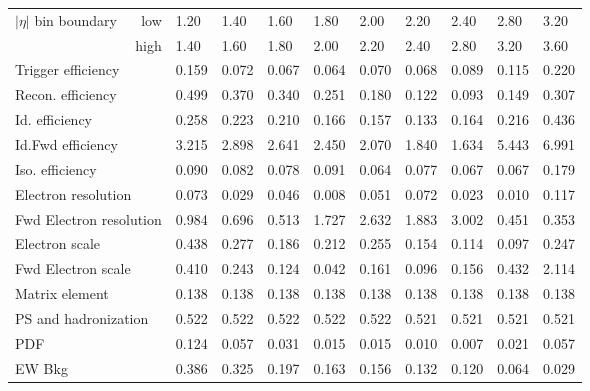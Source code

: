\begin{table}
\centering
\begin{tabular}{l r p{0.7cm}p{0.7cm}p{0.7cm}p{0.7cm}p{0.7cm}p{0.7cm}p{0.7cm}p{0.7cm}l}
\hline \hline
\multirow{2}{*}{$|\eta|$ bin boundary} & low  & 1.20 & 1.40 & 1.60 & 1.80 & 2.00 & 2.20 & 2.40 & 2.80 & 3.20 \\
                                       & high & 1.40 & 1.60 & 1.80 & 2.00 & 2.20 & 2.40 & 2.80 & 3.20 & 3.60  \\
\hline
\multicolumn{2}{l}{Trigger efficiency}            & 0.159 & 0.072 & 0.067 & 0.064 & 0.070 & 0.068 & 0.089 & 0.115 & 0.220 \\
\multicolumn{2}{l}{Recon. efficiency}             & 0.499 & 0.370 & 0.340 & 0.251 & 0.180 & 0.122 & 0.093 & 0.149 & 0.307 \\
\multicolumn{2}{l}{Id. efficiency}                & 0.258 & 0.223 & 0.210 & 0.166 & 0.157 & 0.133 & 0.164 & 0.216 & 0.436 \\
\multicolumn{2}{l}{Id.Fwd efficiency}             & 3.215 & 2.898 & 2.641 & 2.450 & 2.070 & 1.840 & 1.634 & 5.443 & 6.991 \\
\multicolumn{2}{l}{Iso. efficiency}               & 0.090 & 0.082 & 0.078 & 0.091 & 0.064 & 0.077 & 0.067 & 0.067 & 0.179 \\
\multicolumn{2}{l}{Electron resolution}           & 0.073 & 0.029 & 0.046 & 0.008 & 0.051 & 0.072 & 0.023 & 0.010 & 0.117 \\
\multicolumn{2}{l}{Fwd Electron resolution}       & 0.984 & 0.696 & 0.513 & 1.727 & 2.632 & 1.883 & 3.002 & 0.451 & 0.353 \\
\multicolumn{2}{l}{Electron scale}                & 0.438 & 0.277 & 0.186 & 0.212 & 0.255 & 0.154 & 0.114 & 0.097 & 0.247 \\
\multicolumn{2}{l}{Fwd Electron scale}            & 0.410 & 0.243 & 0.124 & 0.042 & 0.161 & 0.096 & 0.156 & 0.432 & 2.114 \\
\multicolumn{2}{l}{Matrix element}                & 0.138 & 0.138 & 0.138 & 0.138 & 0.138 & 0.138 & 0.138 & 0.138 & 0.138 \\
\multicolumn{2}{l}{PS and hadronization}          & 0.522 & 0.522 & 0.522 & 0.522 & 0.522 & 0.521 & 0.521 & 0.521 & 0.521 \\
\multicolumn{2}{l}{PDF}                           & 0.124 & 0.057 & 0.031 & 0.015 & 0.015 & 0.010 & 0.007 & 0.021 & 0.057 \\
\multicolumn{2}{l}{EW Bkg}                        & 0.386 & 0.325 & 0.197 & 0.163 & 0.156 & 0.132 & 0.120 & 0.064 & 0.029 \\

\end{tabular}
\end{table}
